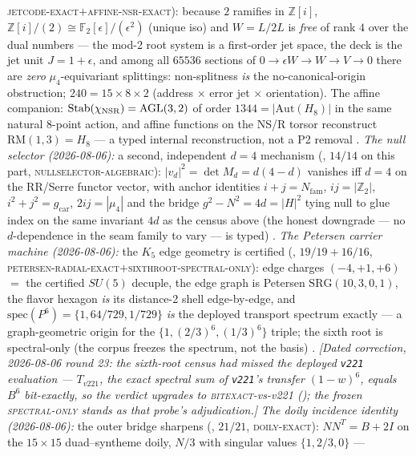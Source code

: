 \documentclass[11pt,a4paper]{article}
\newcommand{\gcar}{g_{\mathrm{car}}}
\newcommand{\Nfam}{N_{\mathrm{fam}}}
\newcommand{\Z}{\mathbb{Z}}
\theoremstyle{definition}
\begin{document}
\begin{keybox}
\textsc{jetcode-exact}$+$\textsc{affine-nsr-exact}): because $2$
ramifies in $\Z[i]$,
$\Z[i]/(2)\cong\mathbb F_2[\epsilon]/(\epsilon^2)$ (unique iso)
and $W=L/2L$ is \emph{free} of rank $4$ over the dual numbers ---
the mod-2 root system is a first-order jet space, the deck is the
jet unit $J=1{+}\epsilon$, and among all $65536$ sections of
$0\to\epsilon W\to W\to V\to0$ there are \emph{zero}
$\mu_4$-equivariant splittings: non-splitness \emph{is} the
no-canonical-origin obstruction; $240=15\times8\times2$ (address
$\times$ error jet $\times$ orientation).  The affine companion:
$\mathrm{Stab}(\chi_{\rm NSR})=\mathrm{AGL}(3,2)$ of order
$1344=|\mathrm{Aut}(H_8)|$ in the same natural 8-point action,
and affine functions on the NS/R torsor reconstruct
$\mathrm{RM}(1,3)=H_8$ --- a typed internal reconstruction, not a
P2 removal \mE.
\emph{The null selector (2026-08-06):} a second, independent
$d=4$ mechanism
(, $14/14$ on this part,
\textsc{nullselector-algebraic}): $|v_d|^2=\det M_d=d(4-d)$
vanishes iff $d=4$ on the RR/Serre functor vector, with anchor
identities $i{+}j=\Nfam$, $ij=|\Z_2|$, $i^2{+}j^2=\gcar$,
$2ij=|\mu_4|$ and the bridge $g^2-N^2=4d=|H|^2$ tying null to
glue index on the same invariant $4d$ as the census above (the
honest downgrade --- no $d$-dependence in the seam family to vary
--- is typed) \mE.
\emph{The Petersen carrier machine (2026-08-06):} the $K_5$ edge
geometry is certified
(, $19/19+16/16$,
\textsc{petersen-radial-exact}$+$\textsc{sixthroot-spectral-only}):
edge charges $(-4,+1,+6)$ $=$ the certified $SU(5)$ decuple, the
edge graph is Petersen $\mathrm{SRG}(10,3,0,1)$, the flavor
hexagon \emph{is} its distance-2 shell edge-by-edge, and
$\mathrm{spec}(P^6)=\{1,64/729,1/729\}$ \emph{is} the deployed
transport spectrum exactly --- a graph-geometric origin for the
$\{1,(2/3)^6,(1/3)^6\}$ triple; the sixth root is spectral-only
(the corpus freezes the spectrum, not the basis) \mE.
\emph{[Dated correction, 2026-08-06 round 23: the sixth-root
census had missed the deployed \texttt{v221} evaluation ---
$T_{v221}$, the exact spectral sum of \texttt{v221}'s transfer
$(1-w)^6$, equals $B^6$ \emph{bit-exactly}, so the verdict
upgrades to \textsc{bitexact}-vs-v221
(); the frozen
\textsc{spectral-only} stands as that probe's adjudication.]}
\emph{The doily incidence identity (2026-08-06):} the outer
bridge sharpens
(, $21/21$,
\textsc{doily-exact}): $NN^{T}=B+2I$ on the $15\times15$
duad--syntheme doily, $N/3$ with singular values $\{1,2/3,0\}$ ---

\end{keybox}
\end{document}
